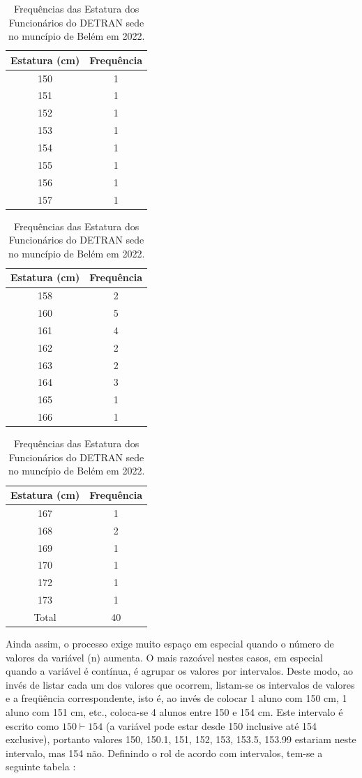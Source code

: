 \begin{center}
\begin{table}[!htb]
    \centering
    {
    \caption{Frequências das Estatura dos Funcionários do DETRAN sede no muncípio de Belém em 2022.}
    \label{estatura2}
    \vspace{0.2cm}
\begin{tabular}{c|c}
\hline\hline
Estatura (cm) & Frequência \\
  \hline\hline
  150 & 1  \\
  151 & 1 \\
  152 & 1  \\
  153 & 1  \\
  154 & 1  \\
  155 & 1  \\
  156 & 1  \\
  157 & 1  \\
  \hline\hline
\end{tabular}}
\begin{tabular}{c|c}
\hline\hline 
Estatura (cm) & Frequência \\
  \hline\hline
  158 & 2  \\
  160 & 5 \\
  161 & 4  \\
  162 & 2  \\
  163 & 2  \\
  164 & 3  \\
  165 & 1  \\
  166 & 1  \\
  \hline\hline
\end{tabular}
\begin{tabular}{c|c}
\hline
Estatura (cm) & Frequência \\
  \hline\hline
  167 & 1  \\
  168 & 2 \\
  169 & 1  \\
  170 & 1 \\
  172 & 1 \\
  173 & 1 \\
  \hline\hline
  Total & 40 \\
  \hline\hline
\end{tabular}
\end{table}
\end{center}


\newpage 

Ainda assim, o processo exige muito espaço em especial quando o
número de valores da variável (n) aumenta. O mais razoável nestes
casos, em especial quando a variável é contínua, é agrupar os
valores por intervalos. Deste modo, ao invés de listar cada um dos
valores que ocorrem, listam-se os intervalos de valores e a
freqüência correspondente, isto é, ao invés de colocar 1 aluno com
150 cm, 1 aluno com 151 cm, etc., coloca-se 4 alunos entre 150 e
154 cm. Este intervalo é escrito como $150 \vdash 154$ (a variável
pode estar desde 150 inclusive até 154 exclusive), portanto
valores 150, 150.1, 151, 152, 153, 153.5, 153.99 estariam neste
intervalo, mas 154 não. Definindo o rol de acordo com intervalos,
tem-se a seguinte tabela :


